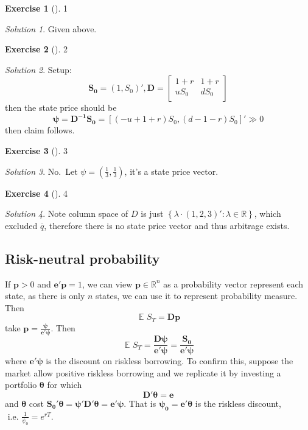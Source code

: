 \documentclass[
  12pt,
  oneside]{book}
\newcommand{\bm}[1]{\symbf{#1}}
\theoremstyle{definition}
\theoremstyle{definition}
\theoremstyle{definition}
\newtheorem{exercise}{Exercise}[chapter]
\theoremstyle{definition}
\theoremstyle{remark}
\newtheorem*{solution}{Solution}
\begin{document}
\begin{exercise}[]
1
\end{exercise}

\begin{solution}
Given above.
\end{solution}

\begin{exercise}[]
2
\end{exercise}

\begin{solution}
Setup:
\[
\bm{S_0}=(1,S_0)', \bm{D}=\begin{bmatrix}
                              1+r   & 1+r   \\
                              uS_0  & dS_0  \\
                          \end{bmatrix}
\]
then the state price should be
\[
\bm{\psi}=\bm{D^{-1}S_0}=[(-u+1+r)S_0,(d-1-r)S_0]'\gg 0
\]
then claim follows.
\end{solution}

\begin{exercise}[]
3
\end{exercise}

\begin{solution}
No.~Let \(\psi=(\frac{1}{3},\frac{1}{3})\), it's a state price vector.
\end{solution}

\begin{exercise}[]
4
\end{exercise}

\begin{solution}
Note column space of \(D\) is just \(\left\{ \lambda\cdot(1,2,3)': \lambda \in \mathbb{R} \right\}\), which excluded \(\overline{q}\), therefore there is no state price vector and thus arbitrage exists.
\end{solution}

\hypertarget{risk-neutral-probability}{%
\subsection{Risk-neutral probability}\label{risk-neutral-probability}}

If \(\bm{p}>0\) and \(\bm{e'p}=1\), we can view \(\bm{p}\in \mathbb{R}^{n}\) as a probability vector represent each state, as there is only \(n\) states, we can use it to represent probability measure. Then
\[
\mathop{{}\mathbb{E}}_{}S_T=\bm{Dp}
\]
take \(\bm{p=\frac{\psi}{e'\psi}}\). Then
\[
\mathop{{}\mathbb{E}}_{}S_T=\bm{\frac{D\psi}{e'\psi}}=\bm{\frac{S_0}{e'\psi}}
\]
where \(\bm{e'\psi}\) is the discount on riskless borrowing. To confirm this, suppose the market allow positive riskless borrowing and we replicate it by investing a portfolio \(\bm{\theta}\) for which
\[
\bm{D'\theta=e}
\]
and \(\bm{\theta}\) cost \(\bm{S_0'\theta=\psi'D'\theta=e'\psi}\). That is \(\bm{\psi_0}=\bm{e'\theta}\) is the riskless discount, \(\text{ i.e. } \frac{1}{\psi_0}=e^{rT}\).
\end{document}
